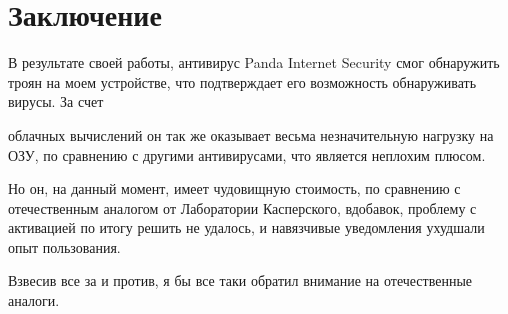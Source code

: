     \section*{Заключение}
    В результате своей работы, антивирус Panda Internet Security смог обнаружить троян на моем устройстве, что подтверждает его возможность обнаруживать вирусы. За счет\par
    облачных вычислений он так же оказывает весьма незначительную нагрузку на ОЗУ, по сравнению с другими антивирусами, что является неплохим плюсом.\par
    Но он, на данный момент, имеет чудовищную стоимость, по сравнению с отечественным аналогом от Лаборатории Касперского, вдобавок, проблему с активацией по итогу
    решить не удалось, и навязчивые уведомления ухудшали опыт пользования.\par
    Взвесив все за и против, я бы все таки обратил внимание на отечественные аналоги.
    \pagebreak


    \printbibliography[heading=bibintoc]
